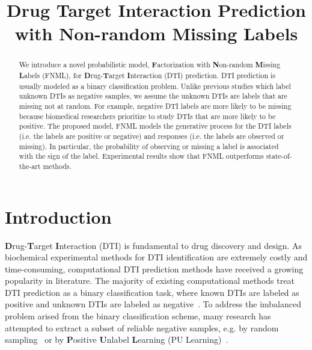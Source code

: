 \documentclass[sigconf,anonymous]{acmart}
\begin{document}
\title{Drug Target Interaction Prediction with Non-random Missing Labels}

\begin{abstract}
We introduce a novel probabilistic model, \textbf{F}actorization with \textbf{N}on-random \textbf{M}issing \textbf{L}abels (FNML), for \textbf{D}rug-\textbf{T}arget \textbf{I}nteraction (DTI) prediction. DTI prediction is usually modeled as a binary classification problem. Unlike previous studies which label unknown DTIs as negative samples, we assume the unknown DTIs are labels that are missing not at random. For example, negative DTI labels are more likely to be missing because biomedical researchers prioritize to study DTIs that are more likely to be positive. The proposed model, FNML models the generative process for the DTI labels (i.e. the labels are positive or negative) and responses (i.e. the labels are observed or missing). In particular, the probability of observing or missing a label is associated with the sign of the label. Experimental results show that FNML outperforms state-of-the-art methods.
\end{abstract}



\maketitle
\section{Introduction}\label{sec:introduction}
\textbf{D}rug-\textbf{T}arget \textbf{I}nteraction (DTI) is fundamental to drug discovery and design. As biochemical experimental methods for DTI identification are extremely costly and time-consuming, computational DTI prediction methods have received a growing popularity in literature. The majority of existing computational methods treat DTI prediction as a binary classification task, where known DTIs are labeled as positive and unknown DTIs are labeled as negative~\cite{Ding2013Similarity}. To address the imbalanced problem arised from the binary classification scheme, many research has attempted to extract a subset of reliable negative samples, e.g. by random sampling~\cite{Luo2017Network} or by \textbf{P}ositive \textbf{U}nlabel \textbf{L}earning (PU Learning)~\cite{Peng2017Screening}.
\end{document}
